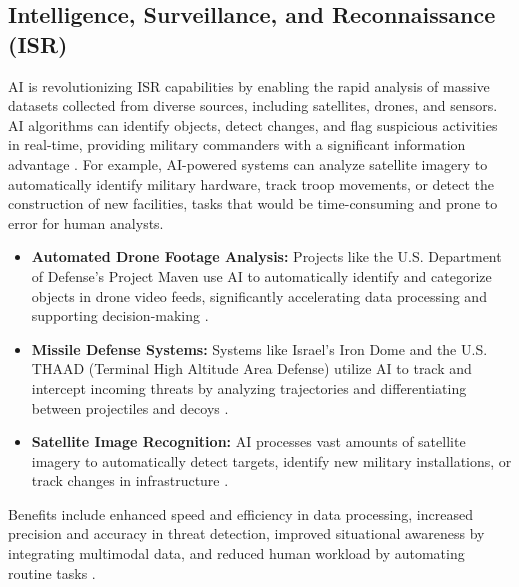 \subsection{Intelligence, Surveillance, and Reconnaissance (ISR)}
AI is revolutionizing ISR capabilities by enabling the rapid analysis of massive datasets collected from diverse sources, including satellites, drones, and sensors. AI algorithms can identify objects, detect changes, and flag suspicious activities in real-time, providing military commanders with a significant information advantage \cite{sayler2020artificial}. For example, AI-powered systems can analyze satellite imagery to automatically identify military hardware, track troop movements, or detect the construction of new facilities, tasks that would be time-consuming and prone to error for human analysts.
\begin{itemize}
    \item \textbf{Automated Drone Footage Analysis:} Projects like the U.S. Department of Defense's Project Maven use AI to automatically identify and categorize objects in drone video feeds, significantly accelerating data processing and supporting decision-making \cite{AIToolsPortal_ISR}.
    \item \textbf{Missile Defense Systems:} Systems like Israel's Iron Dome and the U.S. THAAD (Terminal High Altitude Area Defense) utilize AI to track and intercept incoming threats by analyzing trajectories and differentiating between projectiles and decoys \cite{AIToolsPortal_ISR, DigitalDefynd_ISR}.
    \item \textbf{Satellite Image Recognition:} AI processes vast amounts of satellite imagery to automatically detect targets, identify new military installations, or track changes in infrastructure \cite{TTMS_ISR}.
\end{itemize}
Benefits include enhanced speed and efficiency in data processing, increased precision and accuracy in threat detection, improved situational awareness by integrating multimodal data, and reduced human workload by automating routine tasks \cite{TTMS_ISR_2, ResearchGate_ISR}.

